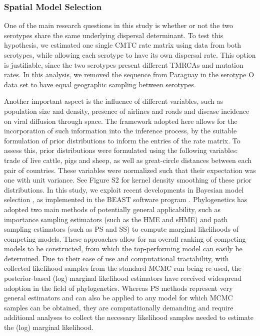 \documentclass[10pt]{article}
\begin{document}
\subsubsection*{Spatial Model Selection}

One of the main research questions in this study is whether or not the two serotypes share the same underlying dispersal determinant. 
To test this hypothesis, we estimated one single CMTC rate matrix using data from both serotypes, while allowing each serotype to have its own dispersal rate. 
This option is justifiable, since the two serotypes present different TMRCAs and mutation rates. 
In this analysis, we removed the sequence from Paraguay in the serotype O data set to have equal geographic sampling between serotypes.

Another important aspect is the influence of different variables, such as population size and density, presence of airlines and roads and disease incidence on viral diffusion through space. 
The framework adopted here allows for the incorporation of such information into the inference process, by the suitable formulation of prior distributions to inform the entries of the rate matrix. 
To assess this, prior distributions were formulated using the following variables: trade of live cattle, pigs and sheep, as well as great-circle distances between each pair of countries. 
These variables were normalized such that their expectation was one with unit variance. See Figure S2 for kernel density smoothing of these prior distributions.
In this study, we exploit recent developments in Bayesian model selection \cite{Baele2012}, as implemented in the BEAST software program \cite{BEAST}.
Phylogenetics has adopted two main methods of potentially general applicability, such as importance sampling estimators (such as the HME and sHME) and path sampling estimators (such as PS and SS) to compute marginal likelihoods of competing models.
These approaches allow for an overall ranking of competing models to be constructed, from which the top-performing model can easily be determined.
Due to their ease of use and computational tractability, with collected likelihood samples from the standard MCMC run being re-used, the posterior-based (log) marginal likelihood estimators have received widespread adoption in the field of phylogenetics.
Whereas PS methods represent very general estimators and can also be applied to any model for which MCMC samples can be obtained, they are computationally demanding and require additional analyses to collect the necessary likelihood samples needed to estimate the (log) marginal likelihood.
\end{document}
